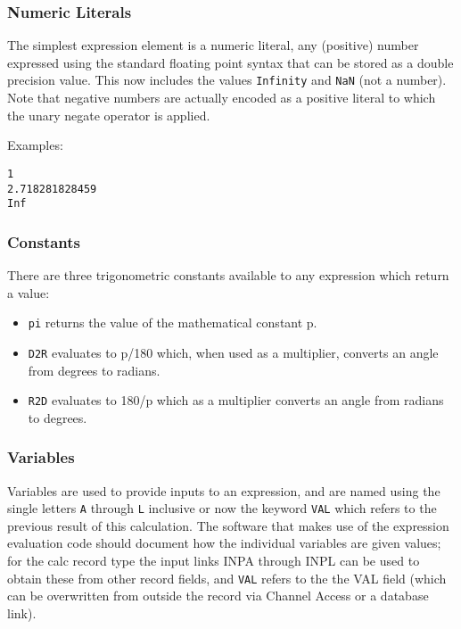 \subsubsection{Numeric Literals}

The simplest expression element is a numeric literal, any (positive) number expressed using the standard floating point 
syntax that can be stored as a double precision value. This now includes the values \verb|Infinity| and \verb|NaN| (not a number). 
Note that negative numbers are actually encoded as a positive literal to which the unary negate operator is applied.

Examples:

\begin{verbatim}1
2.718281828459
Inf
\end{verbatim}\subsubsection{Constants}

There are three trigonometric constants available to any expression which return a value:

\begin{itemize}\item \verb|pi| returns the value of the mathematical constant p.

\item \verb|D2R| evaluates to p/180 which, when used as a multiplier, converts an angle from degrees to radians.

\item \verb|R2D| evaluates to 180/p which as a multiplier converts an angle from radians to degrees.

\end{itemize}\subsubsection{Variables}

Variables are used to provide inputs to an expression, and are named using the single letters \verb|A| through \verb|L| inclusive or now 
the keyword \verb|VAL| which refers to the previous result of this calculation. The software that makes use of the expression 
evaluation code should document how the individual variables are given values; for the calc record type the input links 
INPA through INPL can be used to obtain these from other record fields, and \verb|VAL| refers to the the VAL field (which can 
be overwritten from outside the record via Channel Access or a database link).

